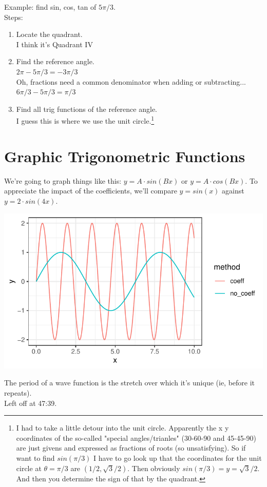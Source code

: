 \documentclass{article}
\begin{document}
Example: find sin, cos, tan of $5\pi/3$.\\

Steps:
\begin{enumerate}
    \item Locate the quadrant.\\
        I think it's Quadrant IV\\
    \item Find the reference angle.\\
        $2\pi - 5\pi/3 = -3\pi / 3$\\
        Oh, fractions need a common denominator when adding or subtracting...\\
        $6\pi/3 - 5\pi/3 = \pi/3$\\
    \item Find all trig functions of the reference angle.\\
        I guess this is where we use the unit circle.\footnote{I had to take a little
            detour into the unit circle. Apparently the x y coordinates of the so-called
            "special angles/trianles" (30-60-90 and 45-45-90) are just givens and
            expressed as fractions of roots (so unsatisfying). So if want to find
            $sin(\pi/3)$ I have to go look up that the coordinates for the unit circle at
            $\theta = \pi/3$ are $(1/2, \sqrt{3}/2)$. Then obviously $sin(\pi/3) = y =
            \sqrt{3}/2$. And then you determine the sign of that by the quadrant.}
        
\end{enumerate}

\section{Graphic Trigonometric Functions}

We're going to graph things like this: $y = A \cdot sin(Bx)$ or $y = A \cdot cos(Bx)$. To
appreciate the impact of the coefficients, we'll compare $y = sin(x)$ against $y = 2 \cdot
sin(4x)$.

\includegraphics{fig1.pdf}

The period of a wave function is the stretch over which it's unique (ie, before it
repeats). \\

Left off at 47:39.
\end{document}
